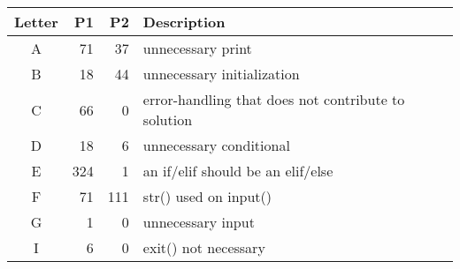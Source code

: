 \small
\begin{supertabular}{crrp{.5\textwidth}}
\label{labelsC}
Letter & P1 & P2 & Description \\ 
\toprule
A & 71 & 37 & unnecessary print \\
B & 18 & 44 & unnecessary initialization \\
C & 66 & 0 & error-handling that does not contribute to solution \\
D & 18 & 6 & unnecessary conditional \\
E & 324 & 1 & an if/elif should be an elif/else \\
F & 71 & 111 & str() used on input() \\
G & 1 & 0 & unnecessary input \\
I & 6 & 0 & exit() not necessary \\

\end{supertabular}
\vspace{2em}